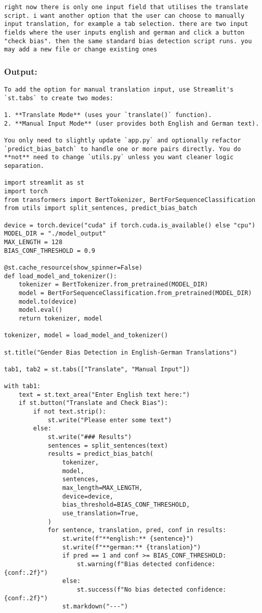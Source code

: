 \begin{lstlisting}
right now there is only one input field that utilises the translate script. i want another option that the user can choose to manually input translation, for example a tab selection. there are two input fields where the user inputs english and german and click a button "check bias". then the same standard bias detection script runs. you may add a new file or change existing ones
\end{lstlisting}

\subsubsection{Output:}
\begin{lstlisting}
To add the option for manual translation input, use Streamlit's `st.tabs` to create two modes:

1. **Translate Mode** (uses your `translate()` function).
2. **Manual Input Mode** (user provides both English and German text).

You only need to slightly update `app.py` and optionally refactor `predict_bias_batch` to handle one or more pairs directly. You do **not** need to change `utils.py` unless you want cleaner logic separation.

import streamlit as st
import torch
from transformers import BertTokenizer, BertForSequenceClassification
from utils import split_sentences, predict_bias_batch

device = torch.device("cuda" if torch.cuda.is_available() else "cpu")
MODEL_DIR = "./model_output"
MAX_LENGTH = 128
BIAS_CONF_THRESHOLD = 0.9

@st.cache_resource(show_spinner=False)
def load_model_and_tokenizer():
    tokenizer = BertTokenizer.from_pretrained(MODEL_DIR)
    model = BertForSequenceClassification.from_pretrained(MODEL_DIR)
    model.to(device)
    model.eval()
    return tokenizer, model

tokenizer, model = load_model_and_tokenizer()

st.title("Gender Bias Detection in English-German Translations")

tab1, tab2 = st.tabs(["Translate", "Manual Input"])

with tab1:
    text = st.text_area("Enter English text here:")
    if st.button("Translate and Check Bias"):
        if not text.strip():
            st.write("Please enter some text")
        else:
            st.write("### Results")
            sentences = split_sentences(text)
            results = predict_bias_batch(
                tokenizer,
                model,
                sentences,
                max_length=MAX_LENGTH,
                device=device,
                bias_threshold=BIAS_CONF_THRESHOLD,
                use_translation=True,
            )
            for sentence, translation, pred, conf in results:
                st.write(f"**english:** {sentence}")
                st.write(f"**german:** {translation}")
                if pred == 1 and conf >= BIAS_CONF_THRESHOLD:
                    st.warning(f"Bias detected confidence: {conf:.2f}")
                else:
                    st.success(f"No bias detected confidence: {conf:.2f}")
                st.markdown("---")


\end{lstlisting}
